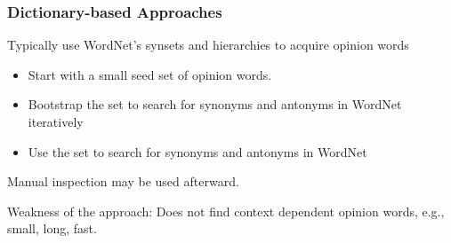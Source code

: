 \documentclass[t]{beamer}
\begin{document}
\begin{frame} \frametitle{Dictionary-based Approaches} %

Typically use WordNet's synsets and hierarchies to acquire opinion words

\begin{itemize}
\item Start with a small seed set of opinion words. 
\item Bootstrap the set to search for synonyms and antonyms in WordNet
  iteratively %
\item Use the set to search for synonyms and antonyms in WordNet %
\end{itemize}
 
\vfill
Manual inspection may be used afterward.

\vfill
Weakness of the approach: Does not find context dependent opinion words, e.g., small, long, fast. 

\end{frame}
\end{document}
